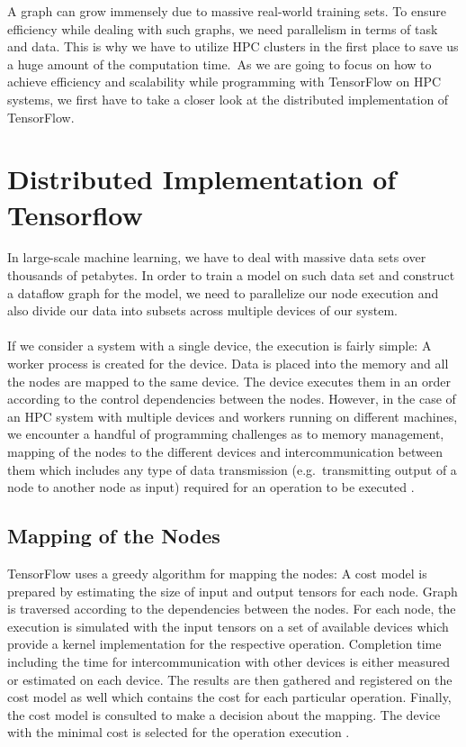 \documentclass[ieeetran]{article}
\begin{document}
\hspace{-0.51cm}A graph can grow immensely due to massive real-world training sets. To ensure efficiency while dealing with such graphs, we need parallelism in terms of task and data. This is why we have to utilize HPC clusters in the first place to save us a huge amount of the computation time.\ As we are going to focus on how to achieve efficiency and scalability while programming with TensorFlow on HPC systems, we first have to take a closer look at the distributed implementation of TensorFlow.


\section{Distributed Implementation of Tensorflow} %
\label{sec:multiple_device_execution_of_a_graph}
In large-scale machine learning, we have to deal with massive data sets over thousands of petabytes. In order to train a model on such data set and construct a dataflow graph for the model, we need to parallelize our node execution and also divide our data into subsets across multiple devices of our system.
\\ \\If we consider a system with a single device, the execution is fairly simple: A worker process is created for the device. Data is placed into the memory and all the nodes are mapped to the same device. The device executes them in an order according to the control dependencies between the nodes. However, in the case of an HPC system with multiple devices and workers running on different machines, we encounter a handful of programming challenges as to memory management, mapping of the nodes to the different devices and intercommunication between them which includes any type of data transmission (e.g.\ transmitting output of a node to another node as input) required for an operation to be executed \cite{first}.

\subsection{Mapping of the Nodes} %
\label{sub:mapping_of_nodes} 
TensorFlow uses a greedy algorithm for mapping the nodes: A cost model is prepared by estimating the size of input and output tensors for each node. Graph is traversed according to the dependencies between the nodes. For each node, the execution is simulated with the input tensors on a set of available devices which provide a kernel implementation for the respective operation. Completion time including the time for intercommunication with other devices is either measured or estimated on each device. The results are then gathered and registered on the cost model as well which contains the cost for each particular operation. Finally, the cost model is consulted to make a decision about the mapping. The device with the minimal cost is selected for the operation execution \cite{first}.
\end{document}
